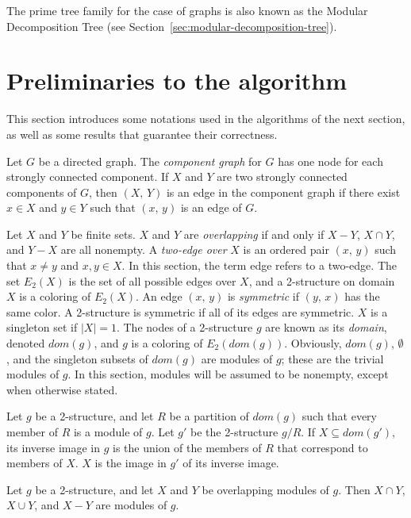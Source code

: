 The prime tree family for the case of graphs is also known as the Modular Decomposition Tree (see Section~\ref{sec:modular-decomposition-tree})\cite{IMD}.


\section{Preliminaries to the algorithm}\label{sec:preliminaries}

This section introduces some notations used in the algorithms of the next section, as well as some results that guarantee their correctness.

Let $G$ be a directed graph.
The \textit{component graph} for $G$ has one node for each strongly connected component.
If $X$ and $Y$ are two strongly connected components of $G$, then $(X,\, Y)$ is an edge in the component graph if there exist $x \in X$ and $y \in Y$ such that $(x,\, y)$ is an edge of $G$.

Let $X$ and $Y$ be finite sets.
$X$ and $Y$ are \textit{overlapping} if and only if $X - Y$, $ X \cap Y$, and $Y - X$ are all nonempty.
A \textit{two-edge over} $X$ is an ordered pair $(x,\, y)$ such that $x \neq y$ and $x, y \in X$.
In this section, the term edge refers to a two-edge.
The set $E_2(X)$ is the set of all possible edges over $X$, and a 2-structure on domain $X$ is a coloring of $E_2(X)$.
An edge $(x,\, y)$ is \textit{symmetric} if $(y,\, x)$ has the same color.
A 2-structure is symmetric if all of its edges are symmetric.
$X$ is a singleton set if $\mid X \mid = 1$.
The nodes of a 2-structure $g$ are known as its \textit{domain}, denoted $dom(g)$, and $g$ is a coloring of $E_2(dom(g))$.
Obviously, $dom(g)$, $\emptyset$, and the singleton subsets of $dom(g)$ are modules of $g$; these are the trivial modules of $g$.
In this section, modules will be assumed to be nonempty, except when otherwise stated.

Let $g$ be a 2-structure, and let $R$ be a partition of $dom(g)$ such that every member of $R$ is a module of $g$.
Let $g'$ be the 2-structure $g / R$.
If $X \subseteq dom(g')$, its inverse image in $g$ is the union of the members of $R$ that correspond to members of $X$.
$X$ is the image in $g'$ of its inverse image.

\begin{mytheo}
    \label{thm:2-1}
    Let $g$ be a 2-structure, and let $X$ and $Y$ be overlapping modules of $g$.
    Then $X \cap Y$, $X \cup Y$, and $X - Y$ are modules of $g$.
\end{mytheo}

